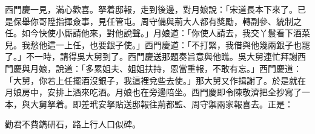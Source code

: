 西門慶一見，滿心歡喜。拏着邸報，走到後邊，對月娘說：「宋道長本下來了。已是保舉你哥陞指揮僉事，見任管屯。周守備與荊大人都有獎勵，轉副參、統制之任。如今快使小厮請他來，對他說聲。」月娘道：「你使人請去，我交丫鬟看下酒菜兒。我愁他這一上任，也要銀子使。」西門慶道：「不打緊，我借與他幾兩銀子也罷了。」不一時，請得吳大舅到了。西門慶送那題奏旨意與他瞧。吳大舅連忙拜謝西門慶與月娘，說道：「多累姐夫、姐姐扶持，恩當重報，不敢有忘。」西門慶道：「大舅，你若上任擺酒沒銀子，我這裡兌些去使。」那大舅又作揖謝了。於是就在月娘房中，安排上酒來吃酒。月娘也在旁邊陪坐。西門慶即令陳敬濟把全抄寫了一本，與大舅拏着。即差玳安拏貼送邸報往荊都監、周守禦兩家報喜去。正是：

\begin{myquote}
勸君不費鐫研石，路上行人口似碑。
\end{myquote}

